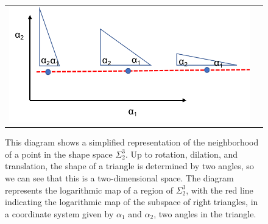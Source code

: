 \begin{figure}[H]
\setlength{\picwi}{0.3\llw}
\begin{tabular}{cc} 
\includegraphics[width=4\picwi,height=2\picwi]{../Figures/righttriangles.png}
\end{tabular}
\caption{\label{fig:shapespace} This diagram shows a simplified representation of the neighborhood of a point in the shape space $\Sigma_2^3$. Up to rotation, dilation, and translation, the shape of a triangle is determined by two angles, so we can see that this is a two-dimensional space.  The diagram represents the logarithmic map of a region of $\Sigma_2^3$, with the red line indicating the logarithmic map of the subspace of right triangles, in a coordinate system given by $\alpha_1$ and $\alpha_2$, two angles in the triangle.
}
\end{figure}





